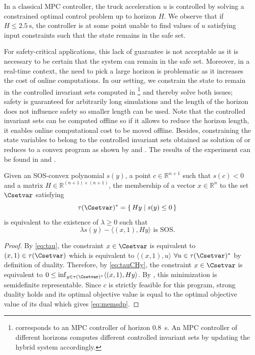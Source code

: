 \documentclass[11pt,twoside,a4paper,openright]{uclouvain-thesis}
\begin{document}
In a classical MPC controller, the truck acceleration $u$ is controlled by solving a constrained optimal control problem up to horizon $H$.
We observe that if $H \leq \SI{2.5}{\second}$, the controller is at some point unable to find values of $u$ satisfying input constraints %
such that the state remains in the safe set.

For safety-critical applications, this lack of guarantee is not acceptable as it is necessary to be certain that the system can remain in the safe set.
Moreover, in a real-time context, the need to pick a large horizon is problematic as it increases the cost of online computations.
In our setting, we constrain the state to remain in the controlled invariant sets computed in \footnote{
   corresponds to an MPC controller of horizon \SI{0.8}{\second}.
  An MPC controller of different horizons computes different controlled invariant sets by updating the hybrid system accordingly.
} and thereby solve both issues;
safety is guaranteed for arbitrarily long simulations and the length of the horizon does not influence safety so smaller length can be used.
Note that the controlled invariant sets can be computed offline so if it allows to reduce the horizon length,
it enables online computational cost to be moved offline.
Besides, constraining the state variables to belong to the controlled invariant sets
obtained as solution of  or 
reduces to a convex program as shown by  and .
The results of the experiment can be found in  and .

\begin{mytheo}
  \label{theo:memsdp}
  Given an SOS-convex polynomial $s(y)$, a point $c \in \mathbb{R}^{n+1}$ such that
  $s(c) < 0$ and a matrix $H \in \mathbb{R}^{(n+1) \times (n+1)}$,
  the membership of a vector $x \in \mathbb{R}^n$ to the set $\Csetvar$ satisfying
  \begin{equation}
    \label{eq:tauCHy}
    \tau(\Csetvar)^* = \{\, Hy \mid s(y) \le 0 \,\}
  \end{equation}
  is equivalent to the existence
  of $\lambda \ge 0$ such that
  \begin{equation}
    \label{eq:memsdp}
    \lambda s(y) - \langle (x, 1), Hy \rangle \text{ is SOS}.
  \end{equation}
  \begin{proof}
    By \eqref{eq:tau}, the constraint $x \in \Csetvar$ is equivalent to $(x, 1) \in \tau(\Csetvar)$
    which is equivalent to $\langle (x, 1), u \rangle$ $\forall u \in \tau(\Csetvar)^*$ by definition
    of duality.
    Therefore, by \eqref{eq:tauCHy}, the constraint $x \in \Csetvar$ is equivalent to
    $0 \le \inf_{y \in \tau(\Csetvar)^*} \langle (x, 1), Hy \rangle$.
    By , this minimization is semidefinite representable.
    Since $c$ is strictly feasible for this program, strong duality holds and
    its optimal objective value is equal to the optimal objective value
    of its dual which gives \eqref{eq:memsdp}. %
  \end{proof}
\end{mytheo}
\end{document}

